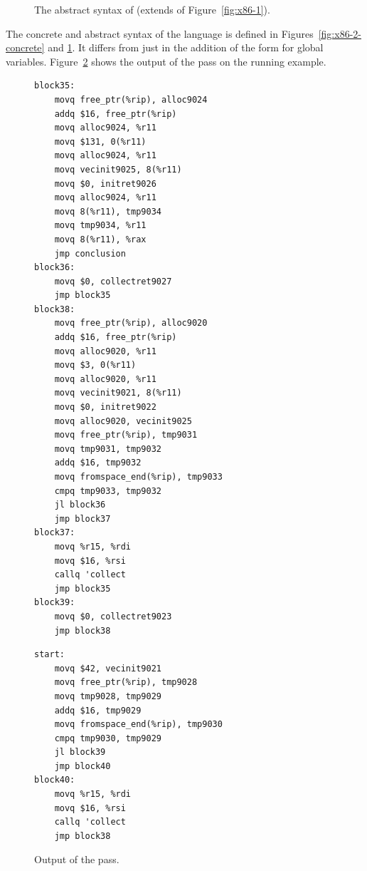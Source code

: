 \documentclass[11pt]{book}
\newcommand{\gray}[1]{{\color{gray} #1}}
\begin{document}
\begin{figure}[tp]
\fbox{
  \begin{minipage}{0.96\textwidth}
    \small
\[
\begin{array}{lcl}
  \Arg &::=&  \gray{  \INT{\Int} \mid \REG{\Reg} \mid \DEREF{\Reg}{\Int}
   \mid \BYTEREG{\Reg}} \\
   &\mid& (\key{Global}~\Var) \\
\LangXGlobal{} &::= & \gray{ \XPROGRAM{\itm{info}}{\LP\LP\itm{label} \,\key{.}\, \Block \RP\ldots\RP} }
\end{array}
\]
\end{minipage}
}
\caption{The abstract syntax of \LangXGlobal{} (extends \LangXIf{} of Figure~\ref{fig:x86-1}).}
\label{fig:x86-2}
\end{figure}

The concrete and abstract syntax of the \LangXGlobal{} language is
defined in Figures~\ref{fig:x86-2-concrete} and \ref{fig:x86-2}.  It
differs from \LangXIf{} just in the addition of the form for global
variables.
%
Figure~\ref{fig:select-instr-output-gc} shows the output of the
 pass on the running example.

\begin{figure}[tbp]
\centering
\begin{minipage}[t]{0.5\textwidth}
\begin{lstlisting}[basicstyle=\ttfamily\scriptsize]
block35:
    movq free_ptr(%rip), alloc9024
    addq $16, free_ptr(%rip)
    movq alloc9024, %r11
    movq $131, 0(%r11)
    movq alloc9024, %r11
    movq vecinit9025, 8(%r11)
    movq $0, initret9026
    movq alloc9024, %r11
    movq 8(%r11), tmp9034
    movq tmp9034, %r11
    movq 8(%r11), %rax
    jmp conclusion
block36:
    movq $0, collectret9027
    jmp block35
block38:
    movq free_ptr(%rip), alloc9020
    addq $16, free_ptr(%rip)
    movq alloc9020, %r11
    movq $3, 0(%r11)
    movq alloc9020, %r11
    movq vecinit9021, 8(%r11)
    movq $0, initret9022
    movq alloc9020, vecinit9025
    movq free_ptr(%rip), tmp9031
    movq tmp9031, tmp9032
    addq $16, tmp9032
    movq fromspace_end(%rip), tmp9033
    cmpq tmp9033, tmp9032
    jl block36
    jmp block37
block37:
    movq %r15, %rdi
    movq $16, %rsi
    callq 'collect
    jmp block35
block39:
    movq $0, collectret9023
    jmp block38
\end{lstlisting}
\end{minipage}
\begin{minipage}[t]{0.45\textwidth}
\begin{lstlisting}[basicstyle=\ttfamily\scriptsize]
start:
    movq $42, vecinit9021
    movq free_ptr(%rip), tmp9028
    movq tmp9028, tmp9029
    addq $16, tmp9029
    movq fromspace_end(%rip), tmp9030
    cmpq tmp9030, tmp9029
    jl block39
    jmp block40
block40:
    movq %r15, %rdi
    movq $16, %rsi
    callq 'collect
    jmp block38
\end{lstlisting}
\end{minipage}
\caption{Output of the  pass.}
\label{fig:select-instr-output-gc}
\end{figure}
\end{document}
